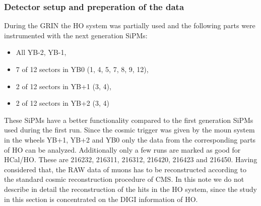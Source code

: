 		\subsubsection{Detector setup and preperation of the data}
			During the GRIN the HO system was partially used and the following parts were instrumented with the next generation SiPMs:
			\begin{itemize}
				\item All YB-2, YB-1,
				\item 7 of 12 sectors in YB0 (1, 4, 5, 7, 8, 9, 12),
				\item 2 of 12 sectors in YB+1 (3, 4),
				\item 2 of 12 sectors in YB+2 (3, 4)
			\end{itemize}
			These SiPMs have a better functionality compared to the first generation SiPMs used during the first run.
			Since the cosmic trigger was given by the moun system in the wheels YB+1, YB+2 and YB0 only the data from the corresponding parts of HO can be analyzed.
			Additionally only a few runs are marked as good for HCal/HO.
			These are 216232, 216311, 216312, 216420, 216423 and 216450.
			Having considered that, the RAW data of muons has to be reconstructed according to the standard cosmic reconstruction procedure of CMS.
			In this note we do not describe in detail the reconstruction of the hits in the HO system, since the study in this section is concentrated on the DIGI information of HO.
